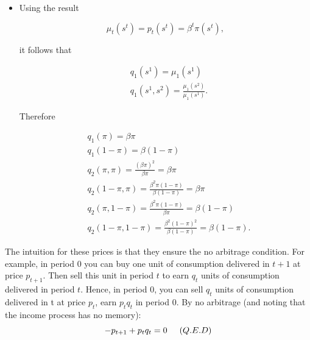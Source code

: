\documentclass[12pt,a4paper]{article}
\begin{document}
\begin{itemize}
\item Using the result

  $$
    \mu_t(s^t) = p_t(s^t) = \beta^t \pi(s^t),
  $$

  it follows that

  \begin{align*}
    & q_1(s^1) = \mu_1(s^1) \\
    & q_1(s^1,s^2) = \frac{\mu_1(s^2)}{\mu_1(s^1)}.
  \end{align*}

  Therefore

  \begin{align*}
    & q_1(\pi) = \beta \pi \\
    & q_1(1 - \pi) = \beta (1 - \pi) \\
    & q_2(\pi, \pi) = \frac{(\beta\pi)^2}{\beta \pi} = \beta \pi \\
    & q_2(1 - \pi, \pi) = \frac{\beta^2\pi(1-\pi)}{\beta (1 - \pi)} = \beta \pi \\
    & q_2(\pi, 1 - \pi) = \frac{\beta^2\pi(1-\pi)}{\beta \pi} = \beta ( 1 - \pi) \\
    & q_2(1 - \pi, 1 - \pi) = \frac{\beta^2(1-\pi)^2}{\beta (1 - \pi)} = \beta (1 - \pi).
  \end{align*}

\end{itemize}

The intuition for these prices is that they ensure the no arbitrage condition. For example, in period 0 you can buy one unit of consumption delivered in $t+1$ at price $p_{t+1}$. Then sell this unit in period $t$ to earn $q_{t}$ units of consumption delivered in period $t$. Hence, in period 0, you can sell $q_t$ units of consumption delivered in t at price $p_t$, earn $p_{t}q_{t}$ in period 0. By no arbitrage (and noting that the income process has no memory):
\begin{equation*}
    -p_{t+1}+p_tq_t=0 \hspace{5mm}(Q.E.D)
\end{equation*}
\end{document}
